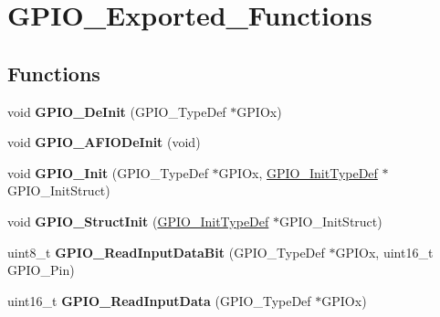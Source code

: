 \hypertarget{group__GPIO__Exported__Functions}{
\section{GPIO\_\-Exported\_\-Functions}
\label{group__GPIO__Exported__Functions}
}
\subsection*{Functions}
\begin{DoxyCompactItemize}
\item 
\hypertarget{group__GPIO__Exported__Functions_gaa60bdf3182c44b5fa818f237042f52ee}{
void {\bfseries GPIO\_\-DeInit} (GPIO\_\-TypeDef $\ast$GPIOx)}
\label{group__GPIO__Exported__Functions_gaa60bdf3182c44b5fa818f237042f52ee}

\item 
\hypertarget{group__GPIO__Exported__Functions_ga7f645e6b6146818c3d6c19021e70170c}{
void {\bfseries GPIO\_\-AFIODeInit} (void)}
\label{group__GPIO__Exported__Functions_ga7f645e6b6146818c3d6c19021e70170c}

\item 
\hypertarget{group__GPIO__Exported__Functions_ga71abf9404261370d03cca449b88d3a65}{
void {\bfseries GPIO\_\-Init} (GPIO\_\-TypeDef $\ast$GPIOx, \hyperlink{structGPIO__InitTypeDef}{GPIO\_\-InitTypeDef} $\ast$GPIO\_\-InitStruct)}
\label{group__GPIO__Exported__Functions_ga71abf9404261370d03cca449b88d3a65}

\item 
\hypertarget{group__GPIO__Exported__Functions_gab28de41278e7f8c63d0851e2733b10df}{
void {\bfseries GPIO\_\-StructInit} (\hyperlink{structGPIO__InitTypeDef}{GPIO\_\-InitTypeDef} $\ast$GPIO\_\-InitStruct)}
\label{group__GPIO__Exported__Functions_gab28de41278e7f8c63d0851e2733b10df}

\item 
\hypertarget{group__GPIO__Exported__Functions_ga98772ef6b639b3fa06c8ae5ba28d3aaa}{
uint8\_\-t {\bfseries GPIO\_\-ReadInputDataBit} (GPIO\_\-TypeDef $\ast$GPIOx, uint16\_\-t GPIO\_\-Pin)}
\label{group__GPIO__Exported__Functions_ga98772ef6b639b3fa06c8ae5ba28d3aaa}

\item 
\hypertarget{group__GPIO__Exported__Functions_ga139a33adc8409288e9f193bbebb5a0f7}{
uint16\_\-t {\bfseries GPIO\_\-ReadInputData} (GPIO\_\-TypeDef $\ast$GPIOx)}
\label{group__GPIO__Exported__Functions_ga139a33adc8409288e9f193bbebb5a0f7}


\end{DoxyCompactItemize}
